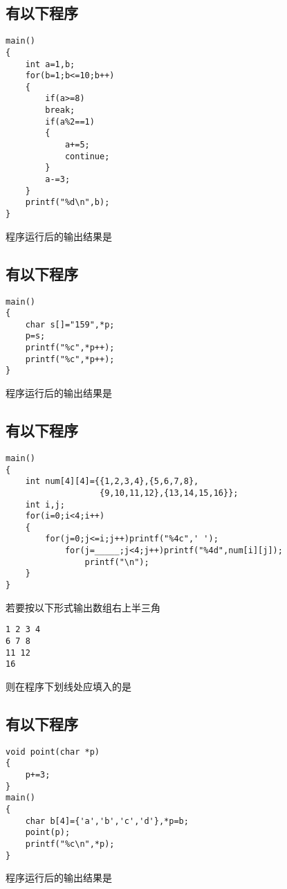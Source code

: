﻿\documentclass  [11pt,twocolumn]{article}
\begin{document}

\subsection{有以下程序}
\begin{lstlisting}
main() 
{
    int a=1,b; 
    for(b=1;b<=10;b++) 
    {
        if(a>=8)
        break; 
        if(a%2==1)
        {
            a+=5;
            continue;
        } 
        a-=3; 
    } 
    printf("%d\n",b); 
} 
\end{lstlisting}
程序运行后的输出结果是\myblank{3em}


\subsection{有以下程序}
\begin{lstlisting}
main() 
{
    char s[]="159",*p; 
    p=s; 
    printf("%c",*p++);
    printf("%c",*p++); 
} 
\end{lstlisting}
程序运行后的输出结果是\myblank{3em}


\subsection{有以下程序}
\begin{lstlisting}
main() 
{
    int num[4][4]={{1,2,3,4},{5,6,7,8},
                   {9,10,11,12},{13,14,15,16}};
    int i,j; 
    for(i=0;i<4;i++) 
    {
        for(j=0;j<=i;j++)printf("%4c",' '); 
            for(j=_____;j<4;j++)printf("%4d",num[i][j]); 
                printf("\n"); 
    } 
} 
\end{lstlisting}
若要按以下形式输出数组右上半三角
\begin{lstlisting}
1 2 3 4
6 7 8
11 12
16
\end{lstlisting}
则在程序下划线处应填入的是\myblank{3em}


\subsection{有以下程序}
\begin{lstlisting}
void point(char *p)
{
    p+=3;
} 
main() 
{
    char b[4]={'a','b','c','d'},*p=b; 
    point(p);
    printf("%c\n",*p); 
} 
\end{lstlisting}
程序运行后的输出结果是\myblank{3em}
\end{document}
